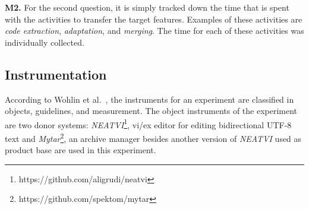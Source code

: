 


 
\textbf{M2.} For the second question, it is simply tracked down the time that is spent with the activities to transfer the target features. Examples of these activities are \emph{code extraction}, \emph{adaptation}, and \emph{merging}. The time for each of these activities was individually collected.

\subsection{Instrumentation}


According to Wohlin et al.~\cite{Wohlin2012}, the instruments for an experiment are classified in objects, guidelines, and measurement. The object instruments of the experiment are two donor systems: \emph{NEATVI}\footnote{https://github.com/aligrudi/neatvi}, vi/ex editor for editing bidirectional UTF-8 text and \emph{Mytar}\footnote{https://github.com/spektom/mytar}, an archive manager besides another version of \emph{NEATVI} used as product base are used in this experiment. 

